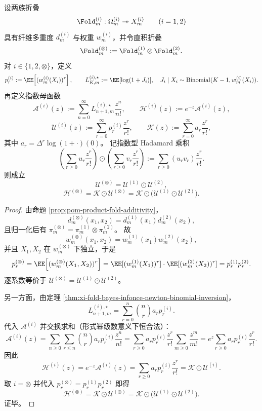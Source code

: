 \begin{theorem}\label{thm:xi-fold-product-infonce-egf-hadamard-law}
设两族折叠
\[
\Fold_m^{(i)}:\Omega_m^{(i)}\twoheadrightarrow X_m^{(i)}\qquad(i=1,2)
\]
具有纤维多重度 \(d_m^{(i)}\) 与权重 \(w_m^{(i)}\)，并令直积折叠
\[
\Fold_m^{(\otimes)}:=\Fold_m^{(1)}\otimes \Fold_m^{(2)}.
\]
对 \(i\in\{1,2,\otimes\}\)，定义
\[
p_r^{(i)}:=\EE\!\left[(w_m^{(i)}(X_i))^r\right],\qquad
L_{K,m}^{(i),\star}:=\EE[\log(1+J_i)],\quad
J_i\mid X_i\sim\mathrm{Binomial}(K-1,w_m^{(i)}(X_i)).
\]
再定义指数母函数
\[
\mathcal A^{(i)}(z):=\sum_{n=0}^{\infty}L_{n+1,m}^{(i),\star}\frac{z^n}{n!},
\qquad
\mathcal H^{(i)}(z):=e^{-z}\mathcal A^{(i)}(z),
\]
\[
\mathcal U^{(i)}(z):=\sum_{r=0}^{\infty}p_r^{(i)}\frac{z^r}{r!},
\qquad
\mathcal K(z):=\sum_{r=0}^{\infty}a_r\frac{z^r}{r!},
\]
其中 \(a_r=\Delta^r\log(1+\cdot)(0)\)。
记指数型 Hadamard 乘积
\[
\left(\sum_{r\ge 0}u_r\frac{z^r}{r!}\right)\odot
\left(\sum_{r\ge 0}v_r\frac{z^r}{r!}\right)
:=\sum_{r\ge 0}(u_rv_r)\frac{z^r}{r!}.
\]
则成立
\[
\mathcal U^{(\otimes)}=\mathcal U^{(1)}\odot\mathcal U^{(2)},
\]
\[
\mathcal H^{(\otimes)}
=\mathcal K\odot\mathcal U^{(\otimes)}
=\mathcal K\odot\bigl(\mathcal U^{(1)}\odot\mathcal U^{(2)}\bigr).
\]
\end{theorem}
\begin{proof}
由命题 \ref{prop:pom-product-fold-additivity}，
\[
d_m^{(\otimes)}(x_1,x_2)=d_m^{(1)}(x_1)d_m^{(2)}(x_2),
\]
且归一化后有 \(\pi_m^{(\otimes)}=\pi_m^{(1)}\otimes\pi_m^{(2)}\)。
故
\[
w_m^{(\otimes)}(x_1,x_2)=w_m^{(1)}(x_1)w_m^{(2)}(x_2),
\]
并且 \(X_1,X_2\) 在 \(w_m^{(\otimes)}\) 下独立，于是
\[
p_r^{(\otimes)}
=\EE\!\left[(w_m^{(\otimes)}(X_1,X_2))^r\right]
=\EE[(w_m^{(1)}(X_1))^r]\cdot \EE[(w_m^{(2)}(X_2))^r]
=p_r^{(1)}p_r^{(2)}.
\]
逐系数等价于
\(
\mathcal U^{(\otimes)}=\mathcal U^{(1)}\odot\mathcal U^{(2)}
\)。
\par
另一方面，由定理 \ref{thm:xi-fold-bayes-infonce-newton-binomial-inversion}，
\[
L_{n+1,m}^{(i),\star}
=\sum_{r=0}^{n}\binom{n}{r}a_r p_r^{(i)}.
\]
代入 \(\mathcal A^{(i)}\) 并交换求和（形式幂级数意义下恒合法）：
\[
\mathcal A^{(i)}(z)
=\sum_{n\ge 0}\sum_{r\le n}\binom{n}{r}a_r p_r^{(i)}\frac{z^n}{n!}
=\sum_{r\ge 0}a_r p_r^{(i)}\frac{z^r}{r!}\sum_{m\ge 0}\frac{z^m}{m!}
=e^z\sum_{r\ge 0}a_r p_r^{(i)}\frac{z^r}{r!}.
\]
因此
\[
\mathcal H^{(i)}(z)
=e^{-z}\mathcal A^{(i)}(z)
=\sum_{r\ge 0}a_r p_r^{(i)}\frac{z^r}{r!}
=\mathcal K\odot\mathcal U^{(i)}.
\]
取 \(i=\otimes\) 并代入 \(p_r^{(\otimes)}=p_r^{(1)}p_r^{(2)}\) 即得
\[
\mathcal H^{(\otimes)}
=\mathcal K\odot\mathcal U^{(\otimes)}
=\mathcal K\odot\bigl(\mathcal U^{(1)}\odot\mathcal U^{(2)}\bigr).
\]
证毕。
\end{proof}




\endinput
